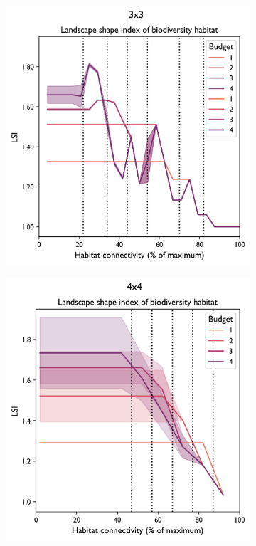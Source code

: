 \begin{figure}[H]
\begin{subfigure}[b]{0.4\textwidth}
         \caption{}
         \label{fig:indicator_simpson4}
    \end{subfigure}
    \hfill
     \begin{subfigure}[b]{0.4\textwidth}
         \centering
         \includegraphics[width=\textwidth]{figures/wildland/LSI_biod3.png}
         \caption{}
         \label{fig:indicator_LSI3}
     \end{subfigure}
     \begin{subfigure}[b]{0.4\textwidth}
         \centering
         \includegraphics[width=.985\textwidth]{figures/wildland/LSI_biod4.png}

\end{subfigure}
\end{figure}

